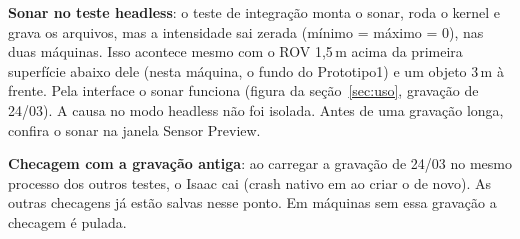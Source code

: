 \item \textbf{Sonar no teste headless}: o teste de integração monta o sonar, roda o kernel e grava os arquivos,
      mas a intensidade sai zerada (mínimo = máximo = 0), nas duas máquinas. Isso acontece mesmo com o ROV 1,5\,m
      acima da primeira superfície abaixo dele (nesta máquina, o fundo do Prototipo1) e um objeto 3\,m à frente. Pela interface o sonar funciona (figura da seção~\ref{sec:uso}, gravação de 24/03). A causa no modo
      headless não foi isolada. Antes de uma gravação longa, confira o sonar na janela Sensor Preview.
\item \textbf{Checagem com a gravação antiga}: ao carregar a gravação de 24/03 no mesmo processo dos outros testes,
      o Isaac cai (crash nativo em  ao criar o  de novo). As outras checagens já estão
      salvas nesse ponto. Em máquinas sem essa gravação a checagem é pulada.
